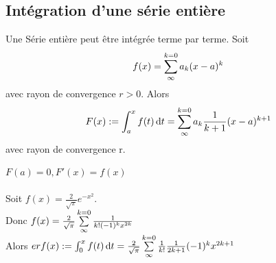 \documentclass[12pt,a4paper]{article}
\begin{document}
{\subsection{Intégration d'une série entière}
\begin{boite}
	\Theoreme Une Série entière peut être intégrée terme par terme. Soit 
	\begin{equation}
		f(x) = \sum\limits_{\infty}^{k=0}{a_k(x-a)^k}
	\end{equation}
	avec rayon de convergence $r > 0$. Alors 
	\begin{equation}
		F(x) := \int_{a}^{x} f(t) \, \mathrm d t = \sum\limits_{\infty}^{k=0}{a_k \frac{1}{k+1}(x-a)^{k+1}}
	\end{equation}
	avec rayon de convergence r.
\end{boite}
 $F(a) = 0, F'(x) = f(x)$\\
\\
Soit $f(x) = \frac{2}{\sqrt{\pi}}e^{-x^2}$. \\
Donc $f(x) =  \frac{2}{\sqrt{\pi}} \sum\limits_{\infty}^{k=0}{\frac{1}{k! (-1)^k x^{2k}}}$\\
Alors $erf(x) := \int_{0}^{x} f(t) \, \mathrm d t = \frac{2}{\sqrt{\pi}} \sum\limits_{\infty}^{k=0}{\frac{1}{k!} \frac{1}{2k+1} (-1)^k x^{2k+1}}$\\
}
\end{document}
